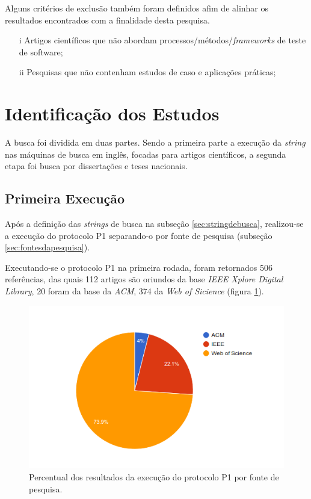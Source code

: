 Alguns critérios de exclusão também foram definidos afim de alinhar os resultados encontrados com a finalidade desta pesquisa.

\begin{enumerate} 
\item [i] Artigos científicos que não abordam processos/métodos/\textit{frameworks} de teste de software;
\item [ii] Pesquisas que não contenham estudos de caso e aplicações práticas;
\end{enumerate}

\section{Identificação dos Estudos}
\label{sec:identificacaodosestudos}

A busca foi dividida em duas partes. Sendo a primeira parte a execução da \textit{string} nas máquinas de busca  em inglês, focadas para artigos científicos, a segunda etapa foi busca por dissertações e teses nacionais.

\subsection{Primeira Execução}
\label{primeiraexecucao}

Após a definição das \textit{strings} de busca na subseção \ref{sec:stringdebusca}, realizou-se a execução do protocolo P1 separando-o por fonte de pesquisa (subseção \ref{sec:fontesdapesquisa}). 

Executando-se o protocolo P1 na primeira rodada, foram retornados 506 referências, das quais 112 artigos são oriundos da base \textit{IEEE Xplore Digital Library}, 20 foram da base da \textit{ACM}, 374 da \textit{Web of Sicience} (figura \ref{fig:figure31}).

\begin{figure}[!ht]
\centering
\includegraphics[width=1\textwidth]{fig/figura31.png}
\caption{Percentual dos resultados da execução do protocolo P1 por fonte de pesquisa.}
\label{fig:figure31}
\end{figure}

